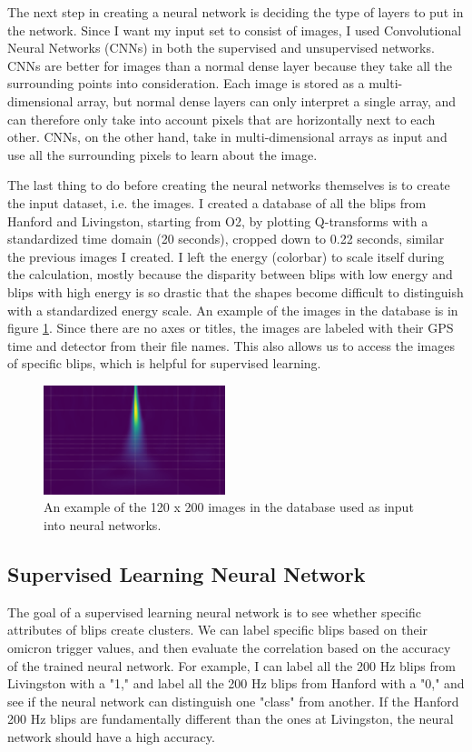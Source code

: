 \documentclass[a4paper]{article}
\begin{document}
The next step in creating a neural network is deciding the type of layers to put in the network. Since I want my input set to consist of images, I used Convolutional Neural Networks (CNNs) in both the supervised and unsupervised networks. CNNs are better for images than a normal dense layer because they take all the surrounding points into consideration. Each image is stored as a multi-dimensional array, but normal dense layers can only interpret a single array, and can therefore only take into account pixels that are horizontally next to each other. CNNs, on the other hand, take in multi-dimensional arrays as input and use all the surrounding pixels to learn about the image. 

The last thing to do before creating the neural networks themselves is to create the input dataset, i.e. the images. I created a database of all the blips from Hanford and Livingston, starting from O2, by plotting Q-transforms with a standardized time domain (20 seconds), cropped down to 0.22 seconds, similar the previous images I created. I left the energy (colorbar) to scale itself during the calculation, mostly because the disparity between blips with low energy and blips with high energy is so drastic that the shapes become difficult to distinguish with a standardized energy scale. An example of the images in the database is in figure \ref{fig:image}. Since there are no axes or titles, the images are labeled with their GPS time and detector from their file names. This also allows us to access the images of specific blips, which is helpful for supervised learning.

\begin{figure}[h!]
	\centering
	\includegraphics[width=.4\linewidth]{image}
	\caption{An example of the 120 x 200 images in the database used as input into neural networks.}
	\label{fig:image}
\end{figure}

\subsection{Supervised Learning Neural Network}

The goal of a supervised learning neural network is to see whether specific attributes of blips create clusters. We can label specific blips based on their omicron trigger values, and then evaluate the correlation based on the accuracy of the trained neural network. For example, I can label all the 200 Hz blips from Livingston with a "1," and label all the 200 Hz blips from Hanford with a "0," and see if the neural network can distinguish one "class" from another. If the Hanford 200 Hz blips are fundamentally different than the ones at Livingston, the neural network should have a high accuracy.
\end{document}
